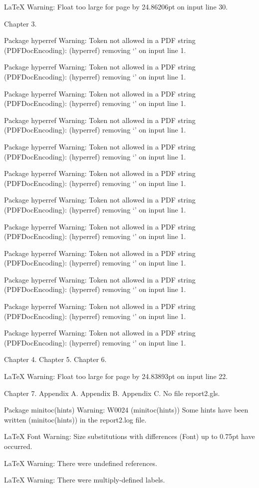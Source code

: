 LaTeX Warning: Float too large for page by 24.86206pt on input line 30.

Chapter 3.

Package hyperref Warning: Token not allowed in a PDF string (PDFDocEncoding):
(hyperref)                removing `\hyphenchar' on input line 1.


Package hyperref Warning: Token not allowed in a PDF string (PDFDocEncoding):
(hyperref)                removing `\font' on input line 1.


Package hyperref Warning: Token not allowed in a PDF string (PDFDocEncoding):
(hyperref)                removing `\hyphenchar' on input line 1.


Package hyperref Warning: Token not allowed in a PDF string (PDFDocEncoding):
(hyperref)                removing `\font' on input line 1.


Package hyperref Warning: Token not allowed in a PDF string (PDFDocEncoding):
(hyperref)                removing `\hyphenchar' on input line 1.


Package hyperref Warning: Token not allowed in a PDF string (PDFDocEncoding):
(hyperref)                removing `\font' on input line 1.


Package hyperref Warning: Token not allowed in a PDF string (PDFDocEncoding):
(hyperref)                removing `\hyphenchar' on input line 1.


Package hyperref Warning: Token not allowed in a PDF string (PDFDocEncoding):
(hyperref)                removing `\font' on input line 1.


Package hyperref Warning: Token not allowed in a PDF string (PDFDocEncoding):
(hyperref)                removing `\hyphenchar' on input line 1.


Package hyperref Warning: Token not allowed in a PDF string (PDFDocEncoding):
(hyperref)                removing `\font' on input line 1.


Package hyperref Warning: Token not allowed in a PDF string (PDFDocEncoding):
(hyperref)                removing `\hyphenchar' on input line 1.


Package hyperref Warning: Token not allowed in a PDF string (PDFDocEncoding):
(hyperref)                removing `\font' on input line 1.

Chapter 4.
Chapter 5.
Chapter 6.

LaTeX Warning: Float too large for page by 24.83893pt on input line 22.

Chapter 7.
Appendix A.
Appendix B.
Appendix C.
No file report2.gls.

Package minitoc(hints) Warning: W0024
(minitoc(hints))                Some hints have been written 
(minitoc(hints))                in the report2.log file.


LaTeX Font Warning: Size substitutions with differences
(Font)              up to 0.75pt have occurred.


LaTeX Warning: There were undefined references.


LaTeX Warning: There were multiply-defined labels.

